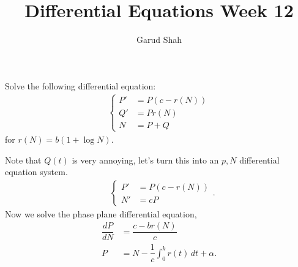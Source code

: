 \documentclass[11pt]{article}
\title{Differential Equations Week \textbf{12}}
\author{Garud Shah}
\begin{document}
    \maketitle \newpage 
    \begin{problem}
        Solve the following differential equation:
        \begin{align}
            \begin{cases}
                P' &= P(c-r(N)) \\
                Q' &= Pr(N) \\
                N &= P+Q
            \end{cases}
        \end{align}
        for $r(N) = b(1+\log N)$.
    \end{problem}
    \begin{solution}
        Note that $Q(t)$ is very annoying, let's turn this into an $p, N$ differential equation system.
        \begin{align}
            &\begin{cases}
                P' &= P(c-r(N)) \\
                N' &= cP 
            \end{cases}.
        \end{align}
        Now we solve the phase plane differential equation,
        \begin{align}
            \dfrac{dP}{dN} &= \dfrac{c-br(N)}{c} \\
            P &= N - \dfrac{1}{c} \int_0^k r(t) \, dt +\alpha.
        \end{align}
        
    \end{solution}
\end{document}
